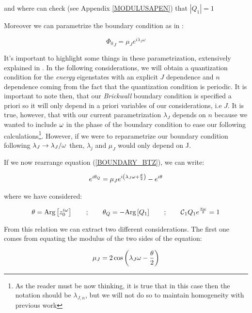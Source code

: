 \documentclass[11pt,a4paper]{article}
\begin{document}
{\noindent and where can check (see Appendix \ref{MODULUSAPEN}) that $\left|Q_1\right|=1$

Moreover we can parametrize the boundary condition as in \cite{Jeong_2025,Das_2023,das2023fuzzballsrandommatrices}:

\begin{equation}
    {\Phi_0}_J = \mu_J e^{i\lambda_J\omega}
\end{equation}

It's important to highlight some things in these parametrization, extensively explained in \cite{das2023fuzzballsrandommatrices}. In the following considerations, we will obtain a quantization condition for the \textit{energy} eigenstates with an explicit $J$ dependence and $n$ dependence coming from the fact that the quantization condition is periodic. It is important to note then, that our \textit{Brickwall} boundary condition is specified a priori so it will only depend in a priori variables of our considerations, i.e $J$. It is true, however, that with our current parametrization $\lambda_J$ depends on $n$ because we wanted to include $\omega$ in the phase of the boundary condition to ease our following calculations\footnote{As the reader must be now thinking, it is true that in this case then the notation should be $\lambda_{J,n}$, but we will not do so to maintain homogeneity with previous work}. However, if we were to reparametrize our boundary condition following $\lambda_J \rightarrow \lambda_J/\omega$ then, $\lambda_j$ and $\mu_J$ would only depend on J.

If we now rearrange equation (\ref{BOUNDARY_BTZ}), we can write:

\begin{equation}\LA{QUANTIZATION_BTZ}
    e^{i\theta_Q} = \mu_J e^{i\left(\lambda_J\w + \frac{\theta}{2}\right)} - e^{i\theta}
\end{equation}

{\noindent where we have considered:}

\begin{equation}
    \theta = \text{Arg}\left[z_0^{i\omega}\right] ~~~~~~;~~~~~~\theta_Q = -\text{Arg}\left[Q_1\right] ~~~~~~;~~~~~~ \mbox{${\cal C}$}_1Q_1e^{\frac{\pi\omega}{2}}=1
\end{equation}

From this relation we can extract two different considerations. The first one comes from equating the modulus of the two sides of the equation:

\begin{equation}\LA{MODULUS_BTZ}
    \mu_J = 2\cos\left(\lambda_J\w - \frac{\theta}{2}\right)
\end{equation}

}
\end{document}
